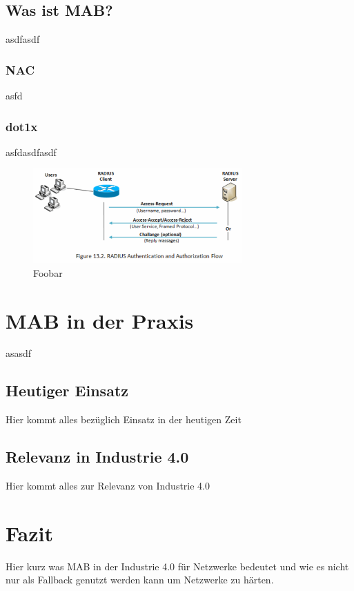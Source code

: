 \documentclass[conference]{IEEEtran}
\begin{document}
\subsection{Was ist MAB?}
asdfasdf

\subsubsection{NAC}
asfd

\subsubsection{dot1x}
asfdasdfasdf

\begin{figure}[hbt]
	\centering
	\includegraphics[width=8cm]{figures/Radius}
	\caption{Foobar \cite{einstein}}
\end{figure}

\section{MAB in der Praxis}
asasdf

\subsection{Heutiger Einsatz}
Hier kommt alles bezüglich Einsatz in der heutigen Zeit \cite{Nave:InverseSquareLawSound}

\subsection{Relevanz in Industrie 4.0}
Hier kommt alles zur Relevanz von Industrie 4.0

\section{Fazit}
Hier kurz was MAB in der Industrie 4.0 für Netzwerke bedeutet und wie es nicht nur als Fallback genutzt werden kann um Netzwerke zu härten.
\end{document}
